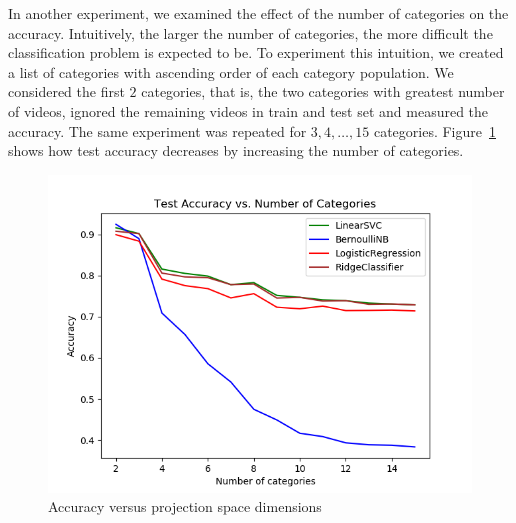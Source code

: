 In another experiment, we examined the effect of the number of categories on the accuracy. Intuitively, the larger the number of categories, the more difficult the classification problem is expected to be. To experiment this intuition, we created a list of categories with ascending order of each category population. We considered the first $2$ categories, that is, the two categories with greatest number of videos, ignored the remaining videos in train and test set and measured the accuracy. The same experiment was repeated for $3, 4, \ldots, 15$ categories.
Figure~\ref{fig:cat-num-test} shows how test accuracy decreases by increasing the number of categories.

\begin{figure}%
\includegraphics[width=1.0\columnwidth]{figures/cat-num-test-acc.png}%
\caption{Accuracy versus projection space dimensions}%
\label{fig:cat-num-test}%
\end{figure}